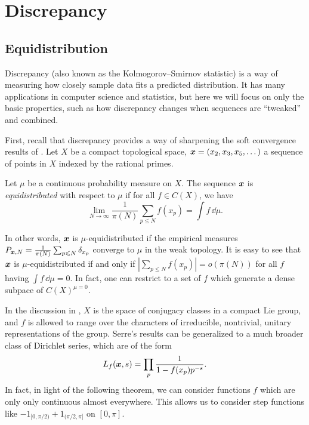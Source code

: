
\chapter{Discrepancy}





\section{Equidistribution}

Discrepancy (also known as the Kolmogorov--Smirnov statistic) is a way of 
measuring how closely sample data fits a predicted distribution. It has many 
applications in computer science and statistics, but here we will focus on only 
the basic properties, such as how discrepancy changes when sequences 
are ``tweaked'' and combined. 

First, recall that discrepancy provides a way of sharpening the soft 
convergence results of \cite[A.1]{serre-1989}. Let $X$ be a compact 
topological space, ${\boldsymbol x} = (x_2,x_3,x_5,\dots)$ a sequence of points in $X$ 
indexed by the rational primes. 

\begin{definition}
Let $\mu$ be a continuous probability measure on $X$. The sequence ${\boldsymbol x}$ is 
\emph{equidistributed} with respect to $\mu$ if for all $f\in C(X)$, we have 
\[
	\lim_{N\to \infty} \frac{1}{\pi(N)} \sum_{p\leqslant N} f(x_p) = \int f\, \dd \mu .
\]
\end{definition}

In other words, ${\boldsymbol x}$ is $\mu$-equidistributed if the empirical measures 
$P_{{\boldsymbol x},N} = \frac{1}{\pi(N)} \sum_{p\leqslant N} \delta_{x_p}$ converge to 
$\mu$ in the weak topology. It is easy to see that ${\boldsymbol x}$ is 
$\mu$-equidistributed if and only if 
$\left| \sum_{p\leqslant N} f(x_p)\right| = o(\pi(N))$ for all $f$ having 
$\int f\, \dd\mu = 0$. In fact, one can restrict to a set of $f$ which 
generate a dense subpace of $C(X)^{\mu = 0}$. 

In the discussion in \cite[A.1]{serre-1989}, $X$ is the space of conjugacy 
classes in a compact Lie group, and $f$ is allowed to range over the characters 
of irreducible, nontrivial, unitary representations of the group. Serre's 
results can be generalized to a much broader class of Dirichlet series, 
which are of the form 
\[
	L_f({\boldsymbol x},s) = \prod_p \frac{1}{1-f(x_p)p^{-s}} .
\]
In fact, in light of the following theorem, we can consider functions $f$ 
which are only only continuous almost everywhere. This allows us to consider 
step functions like $-1_{[0,\pi/2)} + 1_{(\pi/2,\pi]}$ on $[0,\pi]$. 

